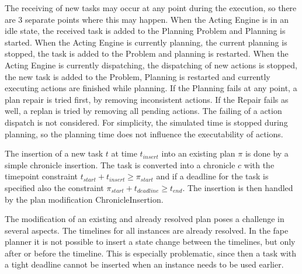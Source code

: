 The receiving of new tasks may occur at any point during the execution, so there are 3 separate points where this may happen.
When the Acting Engine is in an idle state, the received task is added to the Planning Problem and Planning is started.
When the Acting Engine is currently planning, the current planning is stopped, the task is added to the Problem and planning is restarted.
When the Acting Engine is currently dispatching, the dispatching of new actions is stopped, the new task is added to the Problem, Planning is restarted and currently executing actions are finished while planning.
If the Planning fails at any point, a plan repair is tried first, by removing inconsistent actions.
If the Repair fails as well, a replan is tried by removing all pending actions.
The failing of a action dispatch is not considered.
For simplicity, the simulated time is stopped during planning, so the planning time does not influence the executability of actions.

The insertion of a new task $t$ at time $t_{insert}$ into an existing plan $\pi$ is done by a simple chronicle insertion.
The task is converted into a chronicle $c$ with the timepoint constraint $t_{start} + t_{insert} \geq \pi_{start}$ and if a deadline for the task is specified also the constraint $\pi_{start} + t_{deadline} \geq t_{end}$.
The insertion is then handled by the plan modification ChronicleInsertion.

The modification of an existing and already resolved plan poses a challenge in several aspects.
The timelines for all instances are already resolved.
In the fape planner it is not possible to insert a state change between the timelines, but only after or before the timeline.
This is especially problematic, since then a task with a tight deadline cannot be inserted when an instance needs to be used earlier.



